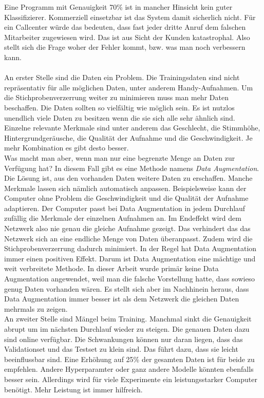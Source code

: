 Eine Programm mit Genauigkeit 70\% ist in mancher Hinsicht kein guter Klassifizierer. Kommerziell einsetzbar ist das System damit sicherlich nicht. Für ein Callcenter würde das bedeuten, dass fast jeder dritte Anruf dem falschen Mitarbeiter zugewiesen wird. Das ist aus Sicht der Kunden katastrophal. Also stellt sich die Frage woher der Fehler kommt, bzw. was man noch verbessern kann.
\\ \\
An erster Stelle sind die Daten ein Problem. Die Trainingsdaten sind nicht repräsentativ für alle möglichen Daten, unter anderem Handy-Aufnahmen. Um die Stichprobenverzerrung weiter zu minimieren muss man mehr Daten beschaffen. Die Daten sollten so vielfältig wie möglich sein. Es ist nutzlos unendlich viele Daten zu besitzen wenn die sie sich alle sehr ähnlich sind. Einzelne relevante Merkmale sind unter anderem das Geschlecht, die Stimmhöhe, Hintergrundgeräusche, die Qualität der Aufnahme und die Geschwindigkeit. Je mehr Kombination es gibt desto besser. 
\\
Was macht man aber, wenn man nur eine begrenzte Menge an Daten zur Verfügung hat? In diesem Fall gibt es eine Methode namens \textit{Data Augmentation}. Die Lösung ist, aus den vorhanden Daten weitere Daten zu erschaffen. Manche Merkmale lassen sich nämlich automatisch anpassen. Beispielsweise kann der Computer ohne Problem die Geschwindigkeit und die Qualität der Aufnahme adaptieren. Der Computer passt bei Data Augmentation in jedem Durchlauf zufällig die Merkmale der einzelnen Aufnahmen an. Im Endeffekt wird dem Netzwerk also nie genau die gleiche Aufnahme gezeigt. Das verhindert das das Netzwerk sich an eine endliche Menge von Daten überanpasst. Zudem wird die Stichprobenverzerrung dadurch minimiert. In der Regel hat Data Augmentation immer einen positiven Effekt. Darum ist Data Augmentation  eine mächtige und weit verbreitete Methode.  In dieser Arbeit wurde primär keine Data Augmentation angewendet, weil man die falsche Vorstellung hatte, dass sowieso genug Daten vorhanden wären. Es stellt sich aber im Nachhinein heraus, dass Data Augmentation immer besser ist als dem Netzwerk die gleichen Daten mehrmals zu zeigen. 
\\
An zweiter Stelle sind Mängel beim Training. Manchmal sinkt die Genauigkeit abrupt um im nächsten Durchlauf wieder zu steigen. Die genauen Daten dazu sind online verfügbar. Die Schwankungen können nur daran liegen, dass das Validationset und das Testset zu klein sind. Das führt dazu, dass sie leicht beeinflussbar sind. Eine Erhöhung auf 25\% der gesamten Daten ist für beide zu empfehlen. Andere Hyperparamter oder ganz andere Modelle könnten ebenfalls besser sein. Allerdings wird für viele Experimente ein leistungsstarker Computer benötigt. Mehr Leistung ist immer hilfreich.
